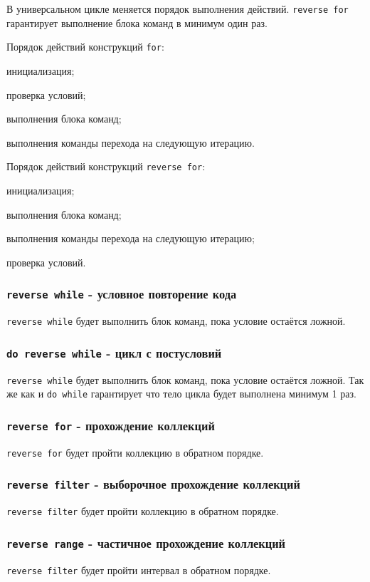В универсальном цикле меняется порядок выполнения действий. \lstinline|reverse for| гарантирует выполнение блока команд в минимум один раз.

Порядок действий конструкций \lstinline|for|:
\begin{icEnum}
	\item инициализация;
	\item проверка условий;
	\item выполнения блока команд;
	\item выполнения команды перехода на следующую итерацию.
\end{icEnum}

Порядок действий конструкций \lstinline|reverse for|:
\begin{icEnum}
	\item инициализация;
	\item выполнения блока команд;
	\item выполнения команды перехода на следующую итерацию;
	\item проверка условий.
\end{icEnum}

\subsubsection{\lstinline|reverse while| - условное повторение кода}

\lstinline|reverse while| будет выполнить блок команд, пока условие остаётся ложной.

\subsubsection{\lstinline|do reverse while| - цикл с постусловий}

\lstinline|reverse while| будет выполнить блок команд, пока условие остаётся ложной. Так же как и \lstinline|do while| гарантирует что тело цикла будет выполнена минимум 1 раз.

\subsubsection{\lstinline|reverse for| - прохождение коллекций}

\lstinline|reverse for| будет пройти коллекцию в обратном порядке.

\subsubsection{\lstinline|reverse filter| - выборочное прохождение коллекций}

\lstinline|reverse filter| будет пройти коллекцию в обратном порядке.

\subsubsection{\lstinline|reverse range| - частичное прохождение коллекций}

\lstinline|reverse filter| будет пройти интервал в обратном порядке.

